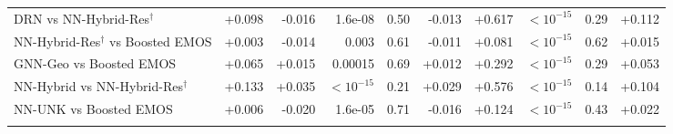 \begin{table}[!htbp]
\begin{tabular}{lrrrrrrrrr}
DRN vs NN-Hybrid-Res$^\dagger$ & +0.098 & -0.016 & 1.6e-08 & 0.50 & -0.013 & +0.617 & $<10^{-15}$ & 0.29 & +0.112 \\
NN-Hybrid-Res$^\dagger$ vs Boosted EMOS & +0.003 & -0.014 & 0.003 & 0.61 & -0.011 & +0.081 & $<10^{-15}$ & 0.62 & +0.015 \\
GNN-Geo vs Boosted EMOS & +0.065 & +0.015 & 0.00015 & 0.69 & +0.012 & +0.292 & $<10^{-15}$ & 0.29 & +0.053 \\
NN-Hybrid vs NN-Hybrid-Res$^\dagger$ & +0.133 & +0.035 & $<10^{-15}$ & 0.21 & +0.029 & +0.576 & $<10^{-15}$ & 0.14 & +0.104 \\
NN-UNK vs Boosted EMOS & +0.006 & -0.020 & 1.6e-05 & 0.71 & -0.016 & +0.124 & $<10^{-15}$ & 0.43 & +0.022 \\
\addlinespace
\bottomrule
\end{tabular}
\end{table}
